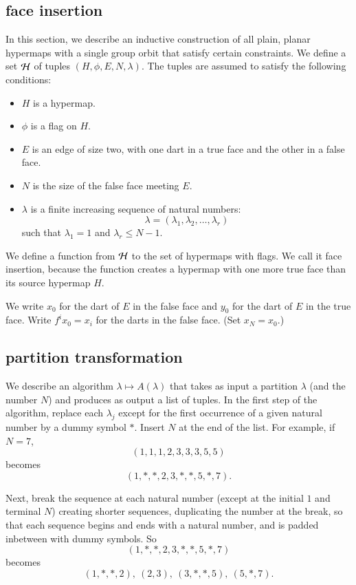 \subsection{face insertion}


In this section, we describe an inductive construction of all
plain, planar hypermaps with a single group orbit that satisfy certain constraints.
We define a set ${\cal H}$ of tuples $(H,\phi,E,N,\lambda)$.
The tuples are assumed to satisfy the following conditions:
\begin{itemize}
    \item $H$ is a hypermap.
    \item $\phi$ is a flag on $H$.
    \item $E$ is an edge of size two, with one
    dart in a true face and the other in a false face.
    \item $N$ is the size of the false face meeting $E$.
    \item $\lambda$ is a finite increasing sequence of natural numbers:
        $$
        \lambda = (\lambda_1,\lambda_2,\ldots,\lambda_r)
        $$
    such that $\lambda_1 = 1$ and $\lambda_r \le N-1$.
\end{itemize}

We define a function from $\cal H$ to the set of hypermaps with
flags.  We call it face insertion, because the function creates a
hypermap with one more true face than its source hypermap $H$.

We write $x_0$ for the dart of $E$ in the
false face and $y_0$ for the dart of $E$ in the true face.  
Write $f^i
x_0 = x_i$ for the darts in the false face.  (Set $x_N = x_0$.)

\subsection{partition transformation}

We describe an algorithm $\lambda\mapsto A(\lambda)$ that takes
as input a partition $\lambda$ (and the number $N$)
and produces as output a list of
tuples.
In the first step of the algorithm,
replace each $\lambda_j$ except for the
first occurrence of a given natural number by a dummy symbol $*$.
Insert $N$ at the end of the list. For example, if $N=7$,
    $$(1,1,1,2,3,3,3,5,5)$$ becomes
    $$(1,*,*,2,3,*,*,5,*,7).$$

Next, break the sequence at each natural number (except at the initial $1$
and terminal $N$)
creating shorter sequences, duplicating the number at the break,
so that each sequence begins and ends with a natural number,
and is padded inbetween with dummy symbols. So
    $$(1,*,*,2,3,*,*,5,*,7)$$ becomes
$$(1,*,*,2),\ (2,3),\ (3,*,*,5),\ (5,*,7).$$

